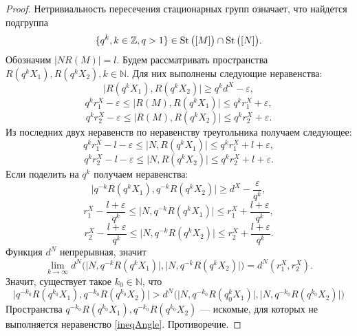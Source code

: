 \begin{proof}
  Нетривиальность пересечения стационарных групп означает, что
  найдется подгруппа \[
    \{q^k, k\in \mathbb{Z}, q> 1\} \in \operatorname{St}\big([M]\big) \cap \operatorname{St} \big([N]\big).
  \]
  Обозначим \( |N R(M)| = l \). Будем рассматривать пространства \(
  R(q^k X_1), R(q^k X_2), k \in \mathbb{N} \). Для них выполнены
  следующие неравенства:
  \[
    \big| R(q^k X_1), R(q^k X_2) \big| \ge q^k d^X - \varepsilon,
  \]
  \[
    q^k r_1^X - \varepsilon  \le\big | R(M), R(q^k X_1) \big| \le q^k
    r_1^X + \varepsilon ,
  \]
  \[
    q^k r_2^X - \varepsilon  \le\big | R(M), R(q^k X_2) \big| \le q^k
    r_2^X + \varepsilon .
  \]
  Из последних двух неравенств по неравенству треугольника получаем следующее:
  \[
    q^k r_1^X - l - \varepsilon \le \big|N, R(q^k X_1) \big| \le q^k
    r_1^X + l + \varepsilon,
  \]
  \[
    q^k r_2^X - l - \varepsilon \le \big|N, R(q^k X_2) \big| \le q^k
    r_2^X + l + \varepsilon.
  \]
  Если поделить на \( q^k \) получаем неравенства:
  \[
    \big| q^{-k}R(q^k X_1), q^{-k}R(q^k X_2) \big| \ge d^X -
    \frac{\varepsilon }{q^k},
  \]
  \[
    r_1^X - \frac{l + \varepsilon}{q^k} \le \big|N, q^{-k}R(q^k X_1)
    \big| \le
    r_1^X + \frac{l + \varepsilon}{q^k},
  \]
  \[
    r_2^X - \frac{l + \varepsilon}{q^k} \le \big|N, q^{-k}R(q^k X_2)
    \big| \le
    r_2^X + \frac{l + \varepsilon}{q^k}.
  \]
  Функция \( d^N \) непрерывная, значит
  \[
    \lim_{k \rightarrow \infty
    }d^N\Big(\big|N, q^{-k}R(q^k X_1)
      \big|, \big|N, q^{-k}R(q^k X_2)
    \big|\Big) = d^N(r_1^X, r_2^X).
  \]
  Значит, существует такое \( k_0 \in \mathbb{N} \), что
  \[
    \big| q^{-k_0}R(q^{k_0} X_1), q^{-k_0}R(q^{k_0} X_2) \big| >
    d^N\Big(\big|N, q^{-k_0}R(q^k_0 X_1)
      \big|, \big|N, q^{-k_0}R(q^{k_0} X_2)
    \big|\Big)
  \]
  Пространства \( q^{-k_0}R(q^{k_0}X_1), q^{-k_0}R(q^{k_0}X_2)\) ---
  искомые, для которых не выполняется неравенство \ref{ineqAngle}. Противоречие.
\end{proof}
